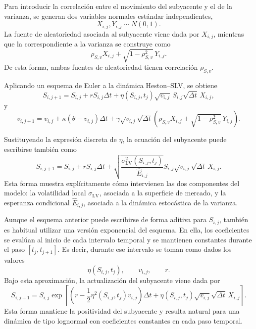 Para introducir la correlación entre el movimiento del subyacente y el de la varianza, se generan dos variables normales estándar independientes,
\[
X_{i,j},Y_{i,j}\sim N(0,1).
\]
La fuente de aleatoriedad asociada al subyacente viene dada por \(X_{i,j}\), mientras que la correspondiente a la varianza se construye como
\[
\rho_{S,v}X_{i,j}
+
\sqrt{1-\rho_{S,v}^2}\,Y_{i,j}.
\]
De esta forma, ambas fuentes de aleatoriedad tienen correlación \(\rho_{S,v}\).

Aplicando un esquema de Euler a la dinámica Heston--SLV, se obtiene
\begin{equation}
\label{eq:euler_heston_slv_S}
S_{i,j+1}
=
S_{i,j}
+
rS_{i,j}\Delta t
+
\eta(S_{i,j},t_j)\sqrt{v_{i,j}}\,S_{i,j}\sqrt{\Delta t}\,X_{i,j},
\end{equation}
y
\begin{equation}
\label{eq:euler_heston_slv_v}
v_{i,j+1}
=
v_{i,j}
+
\kappa(\theta-v_{i,j})\Delta t
+
\gamma\sqrt{v_{i,j}}\sqrt{\Delta t}
\left(
\rho_{S,v}X_{i,j}
+
\sqrt{1-\rho_{S,v}^2}\,Y_{i,j}
\right).
\end{equation}

Sustituyendo la expresión discreta de \(\eta\), la ecuación del subyacente puede escribirse también como
\begin{equation}
\label{eq:euler_heston_slv_S_expanded}
S_{i,j+1}
=
S_{i,j}
+
rS_{i,j}\Delta t
+
\sqrt{
\frac{
\sigma_{\mathrm{LV}}^2(S_{i,j},t_j)
}{
\widehat{E}_{i,j}
}
}
S_{i,j}\sqrt{v_{i,j}}\sqrt{\Delta t}\,X_{i,j}.
\end{equation}
Esta forma muestra explícitamente cómo intervienen las dos componentes del modelo: la volatilidad local \(\sigma_{\mathrm{LV}}\), asociada a la superficie de mercado, y la esperanza condicional \(\widehat{E}_{i,j}\), asociada a la dinámica estocástica de la varianza.

Aunque el esquema anterior puede escribirse de forma aditiva para \(S_{i,j}\), también es habitual utilizar una versión exponencial del esquema. En ella, los coeficientes se evalúan al inicio de cada intervalo temporal y se mantienen constantes durante el paso \([t_j,t_{j+1}]\). Es decir, durante ese intervalo se toman como dados los valores
\[
\eta(S_{i,j},t_j),
\qquad
v_{i,j},
\qquad
r.
\]
Bajo esta aproximación, la actualización del subyacente viene dada por
\begin{equation}
\label{eq:log_euler_heston_slv}
S_{i,j+1}
=
S_{i,j}
\exp\left[
\left(
r-\frac{1}{2}\eta^2(S_{i,j},t_j)v_{i,j}
\right)\Delta t
+
\eta(S_{i,j},t_j)\sqrt{v_{i,j}}\sqrt{\Delta t}\,X_{i,j}
\right].
\end{equation}
Esta forma mantiene la positividad del subyacente y resulta natural para una dinámica de tipo lognormal con coeficientes constantes en cada paso temporal.\medskip


